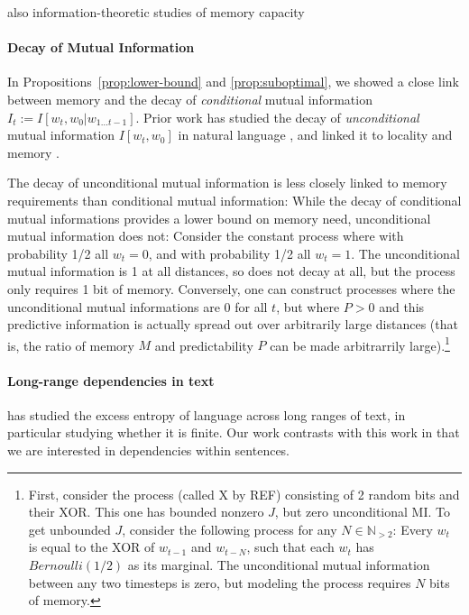 \documentclass[11pt,letterpaper]{article}
\begin{document}
also information-theoretic studies of memory capacity

\paragraph{Decay of Mutual Information}
In Propositions~\ref{prop:lower-bound} and \ref{prop:suboptimal}, we showed a close link between memory and the decay of \emph{conditional} mutual information $I_t := I[w_t, w_0 | w_{1\dots t-1}]$.
Prior work has studied the decay of \emph{unconditional} mutual information $I[w_t, w_0]$ in natural language \citep{ebeling-entropy-1994,lin-critical-2017}, and linked it to locality and memory \citep{futrell-noisy-context-2017}.

The decay of unconditional mutual information is less closely linked to memory requirements than conditional mutual information:
While the decay of conditional mutual informations provides a lower bound on memory need, unconditional mutual information does not:
Consider the constant process where with probability 1/2 all $w_t = 0$, and with probability 1/2 all $w_t = 1$. %
The unconditional mutual information is 1 at all distances, so does not decay at all, but the process only requires 1 bit of memory.
Conversely, one can construct processes where the unconditional mutual informations are 0 for all $t$, but where $P > 0$ and this predictive information is actually spread out over arbitrarily large distances (that is, the ratio of memory $M$ and predictability $P$ can be made arbitrarrily large).\footnote{First, consider the process (called X by REF) consisting of 2 random bits and their XOR. This one has bounded nonzero $J$, but zero unconditional MI. To get unbounded $J$, consider the following process for any $N \in \mathbb{N}_{>2}$: Every $w_t$ is equal to the XOR of $w_{t-1}$ and $w_{t-N}$, such that each $w_t$ has $Bernoulli(1/2)$ as its marginal. The unconditional mutual information between any two timesteps is zero, but modeling the process requires $N$ bits of memory.}



\paragraph{Long-range dependencies in text}    %
\cite{debowski-excess-2011} has studied the excess entropy of language across long ranges of text, in particular studying whether it is finite. %
Our work contrasts with this work in that we are interested in dependencies within sentences.
\end{document}
